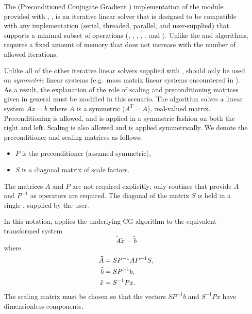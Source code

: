 
The {\pcg} (Preconditioned Conjugate Gradient \cite{HeSt:52})
implementation of the {\sunlinsol} module provided with {\sundials},
{\sunlinsolpcg}, is an iterative linear solver that is designed to be
compatible with any {\nvector} implementation (serial, threaded,
parallel, and user-supplied) that supports a minimal subset of operations
(, , , ,
, and ).  Unlike the {\spgmr} and {\spfgmr}
algorithms, {\pcg} requires a fixed amount of memory that does not
increase with the number of allowed iterations.

Unlike all of the other iterative linear solvers supplied with
{\sundials}, {\pcg} should only be used on \emph{symmetric} linear
systems (e.g.~mass matrix linear systems encountered in
{\arkode}). As a result, the explanation of the role of scaling and
preconditioning matrices given in general must be modified in this
scenario.  The {\pcg} algorithm solves a linear system $Ax = b$ where
$A$ is a symmetric ($A^T=A$), real-valued matrix.  Preconditioning is
allowed, and is applied in a symmetric fashion on both the right and
left.  Scaling is also allowed and is applied symmetrically.  We
denote the preconditioner and scaling matrices as follows:
\begin{itemize}
\item $P$ is the preconditioner (assumed symmetric),
\item $S$ is a diagonal matrix of scale factors.
\end{itemize}
The matrices $A$ and $P$ are not required explicitly; only routines
that provide $A$ and $P^{-1}$ as operators are required.  The diagonal
of the matrix $S$ is held in a single {\nvector}, supplied by the user.

In this notation, {\pcg} applies the underlying CG algorithm to the
equivalent transformed system
\begin{equation}
  \label{eq:transformed_linear_systemPCG}
  \tilde{A} \tilde{x} = \tilde{b}
\end{equation}
where
\begin{align}
  \notag
  \tilde{A} &= S P^{-1} A P^{-1} S,\\
  \label{eq:transformed_linear_system_componentsPCG}
  \tilde{b} &= S P^{-1} b,\\
  \notag
  \tilde{x} &= S^{-1} P x.
\end{align}
The scaling matrix must be chosen so that the vectors $SP^{-1}b$ and
$S^{-1}Px$ have dimensionless components.

